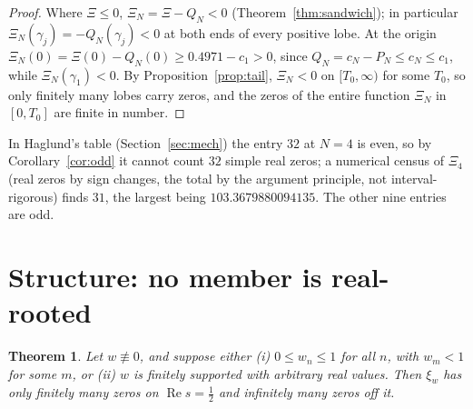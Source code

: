 \documentclass[11pt]{article}
\theoremstyle{plain}
\newtheorem{theorem}{Theorem}[section]
\theoremstyle{definition}
\theoremstyle{remark}
\newcommand{\re}{\operatorname{Re}}
\begin{document}
\begin{proof}
Where $\Xi \le 0$, $\Xi_N = \Xi - Q_N < 0$ (Theorem~\ref{thm:sandwich}); in
particular $\Xi_N(\gamma_j) = -Q_N(\gamma_j) < 0$ at both ends of every positive
lobe. At the origin $\Xi_N(0) = \Xi(0) - Q_N(0) \ge 0.4971 - c_1 > 0$, since
$Q_N = c_N - P_N \le c_N \le c_1$, while $\Xi_N(\gamma_1) < 0$. By
Proposition~\ref{prop:tail}, $\Xi_N < 0$ on $[T_0, \infty)$ for some $T_0$, so
only finitely many lobes carry zeros, and the zeros of the entire function
$\Xi_N$ in $[0, T_0]$ are finite in number.
\end{proof}

In Haglund's table \cite[p.~4]{Hag} (Section~\ref{sec:mech}) the entry $32$ at $N = 4$ is
even, so by Corollary~\ref{cor:odd} it cannot count $32$ simple real zeros; a
numerical census of $\Xi_4$ (real zeros by sign changes, the total by the
argument principle, not interval-rigorous) finds $31$, the largest being
$103.3679880094135$. The other nine entries are odd.

\section{Structure: no member is real-rooted}
\label{sec:structure}

\begin{theorem}\label{thm:A}
Let $w \not\equiv 0$, and suppose either \textup{(i)} $0 \le w_n \le 1$ for all
$n$, with $w_m < 1$ for some $m$, or \textup{(ii)} $w$ is finitely supported with
arbitrary real values. Then $\xi_w$ has only finitely many zeros on
$\re s = \tfrac12$ and infinitely many zeros off it.
\end{theorem}
\end{document}
